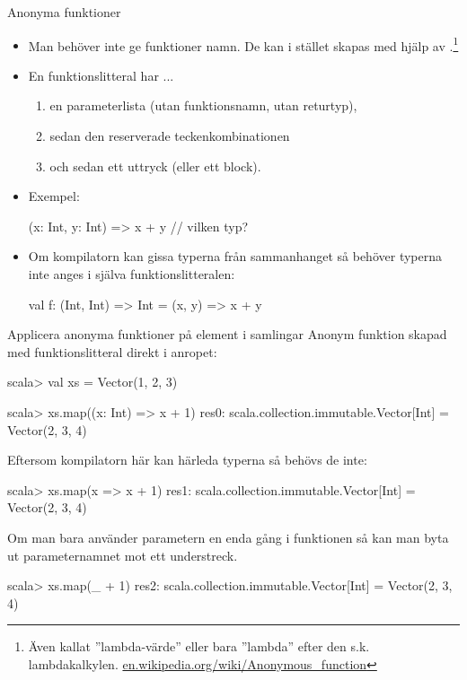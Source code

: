 

\begin{Slide}{Anonyma funktioner}
\begin{itemize}
\item  Man behöver inte ge funktioner namn. De kan i stället skapas med hjälp av .\footnote{Även kallat ''lambda-värde'' eller bara ''lambda'' efter den s.k. lambdakalkylen. \href{https://en.wikipedia.org/wiki/Anonymous_function}{en.wikipedia.org/wiki/Anonymous\_function}}

\item En funktionslitteral har ...
\begin{enumerate}
\item en parameterlista (utan funktionsnamn, utan returtyp),
\item sedan den reserverade teckenkombinationen \code{=>}
\item och sedan ett uttryck (eller ett block).
\end{enumerate}
\pause
\item Exempel:
\begin{Code}[basicstyle=\ttfamily\SlideFontSize{9}{11}]
(x: Int, y: Int) => x + y             // vilken typ?
\end{Code}
\pause
\item Om kompilatorn kan gissa typerna från sammanhanget så behöver typerna inte anges i själva  funktionslitteralen:
\begin{Code}[basicstyle=\ttfamily\SlideFontSize{9}{11}]
val f: (Int, Int) => Int = (x, y) => x + y
\end{Code}
\end{itemize}
\end{Slide}


\begin{Slide}{Applicera anonyma funktioner på element i samlingar}\SlideFontSmall
Anonym funktion skapad med funktionslitteral direkt i anropet:
\begin{REPL}
scala> val xs = Vector(1, 2, 3)

scala> xs.map((x: Int) => x + 1)
res0: scala.collection.immutable.Vector[Int] = Vector(2, 3, 4)
\end{REPL}
\pause
Eftersom kompilatorn här kan härleda typerna så behövs de inte:
\begin{REPL}
scala> xs.map(x => x + 1)
res1: scala.collection.immutable.Vector[Int] = Vector(2, 3, 4)
\end{REPL}
\pause
Om man bara använder parametern en enda gång i funktionen så kan man byta ut parameternamnet mot ett understreck.
\begin{REPL}
scala> xs.map(_ + 1)
res2: scala.collection.immutable.Vector[Int] = Vector(2, 3, 4)
\end{REPL}
\end{Slide}



